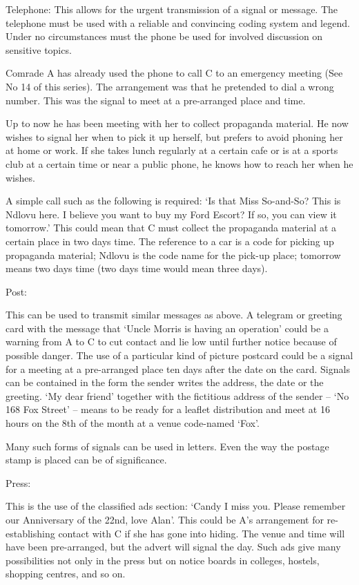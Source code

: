 {Telephone:} This allows for the urgent transmission of a signal or
message. The telephone must be used with a reliable and convincing
coding system and legend. Under no circumstances must the phone be used
for involved discussion on sensitive topics.

Comrade A has already used the phone to call C to an emergency meeting
(See No 14 of this series). The arrangement was that he pretended to
dial a wrong number. This was the signal to meet at a pre-arranged place
and time.

Up to now he has been meeting with her to collect propaganda material.
He now wishes to signal her when to pick it up herself, but prefers to
avoid phoning her at home or work. If she takes lunch regularly at a
certain cafe or is at a sports club at a certain time or near a public
phone, he knows how to reach her when he wishes.

A simple call such as the following is required: `Is that Miss
So-and-So? This is Ndlovu here. I believe you want to buy my Ford
Escort? If so, you can view it tomorrow.' This could mean that C must
collect the propaganda material at a certain place in two days time. The
reference to a car is a code for picking up propaganda material; Ndlovu
is the code name for the pick-up place; tomorrow means two days time
(two days time would mean three days).

{Post:}

This can be used to transmit similar messages as above. A telegram or
greeting card with the message that `Uncle Morris is having an
operation' could be a warning from A to C to cut contact and lie low
until further notice because of possible danger. The use of a particular
kind of picture postcard could be a signal for a meeting at a
pre-arranged place ten days after the date on the card. Signals can be
contained in the form the sender writes the address, the date or the
greeting. `My dear friend' together with the fictitious address of the
sender -- `No 168 Fox Street' -- means to be ready for a leaflet
distribution and meet at 16 hours on the 8th of the month at a venue
code-named `Fox'.

Many such forms of signals can be used in letters. Even the way the
postage stamp is placed can be of significance.

{Press:}

This is the use of the classified ads section: `Candy I miss you. Please
remember our Anniversary of the 22nd, love Alan'. This could be A's
arrangement for re-establishing contact with C if she has gone into
hiding. The venue and time will have been pre-arranged, but the advert
will signal the day. Such ads give many possibilities not only in the
press but on notice boards in colleges, hostels, shopping centres, and
so on.

